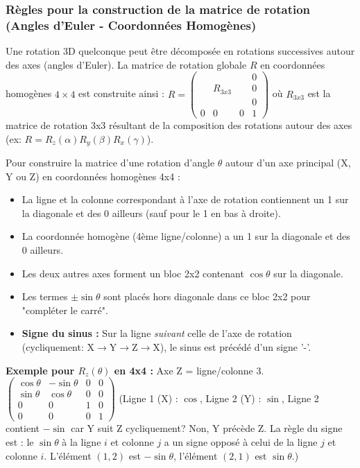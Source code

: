 \documentclass{article}
\begin{document}
\subsubsection{Règles pour la construction de la matrice de rotation (Angles d'Euler - Coordonnées Homogènes)}
Une rotation 3D quelconque peut être décomposée en rotations successives autour des axes (angles d'Euler). La matrice de rotation globale $R$ en coordonnées homogènes $4 \times 4$ est construite ainsi :
$R = \begin{pmatrix} & & & 0 \\ & R_{3x3} & & 0 \\ & & & 0 \\ 0 & 0 & 0 & 1 \end{pmatrix}$
où $R_{3x3}$ est la matrice de rotation 3x3 résultant de la composition des rotations autour des axes (ex: $R = R_z(\alpha) R_y(\beta) R_x(\gamma)$).

Pour construire la matrice d'une rotation d'angle $\theta$ autour d'un axe principal (X, Y ou Z) en coordonnées homogènes 4x4 :
\begin{itemize}
    \item La ligne et la colonne correspondant à l'axe de rotation contiennent un 1 sur la diagonale et des 0 ailleurs (sauf pour le 1 en bas à droite).
    \item La coordonnée homogène (4ème ligne/colonne) a un 1 sur la diagonale et des 0 ailleurs.
    \item Les deux autres axes forment un bloc 2x2 contenant $\cos\theta$ sur la diagonale.
    \item Les termes $\pm\sin\theta$ sont placés hors diagonale dans ce bloc 2x2 pour "compléter le carré".
    \item \textbf{Signe du sinus :} Sur la ligne \textit{suivant} celle de l'axe de rotation (cycliquement: X$\to$Y$\to$Z$\to$X), le sinus est précédé d'un signe '-'.
\end{itemize}
\textbf{Exemple pour $R_z(\theta)$ en 4x4 :} Axe Z = ligne/colonne 3.
$\begin{pmatrix} \cos\theta & -\sin\theta & 0 & 0 \\ \sin\theta & \cos\theta & 0 & 0 \\ 0 & 0 & 1 & 0 \\ 0 & 0 & 0 & 1 \end{pmatrix}$
(Ligne 1 (X) : $\cos$, Ligne 2 (Y) : $\sin$, Ligne 2 contient $-\sin$ car Y suit Z cycliquement? Non, Y précède Z. La règle du signe est : le $\sin\theta$ à la ligne $i$ et colonne $j$ a un signe opposé à celui de la ligne $j$ et colonne $i$. L'élément $(1,2)$ est $-\sin\theta$, l'élément $(2,1)$ est $\sin\theta$.)
\end{document}
